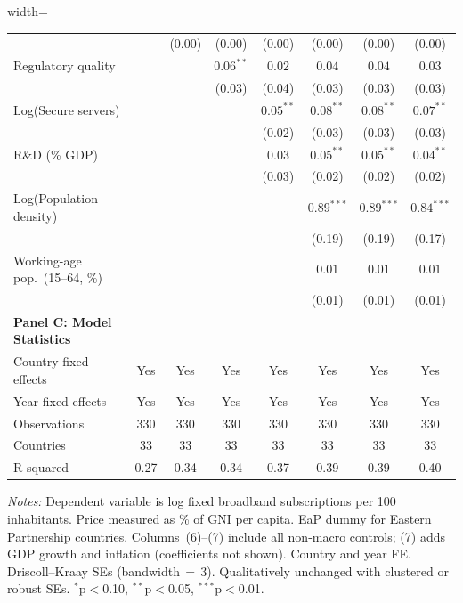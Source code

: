 \begin{table}[H]
\begin{minipage}{\textwidth}
\begin{adjustbox}{width=\textwidth}
\begin{tabular}{@{}lccccccc@{}}
&  & (0.00) & (0.00) & (0.00) & (0.00) & (0.00) & (0.00) \\[2pt]
Regulatory quality &  &  & $0.06^{**}$ & $0.02$ & $0.04$ & $0.04$ & $0.03$ \\
&  &  & (0.03) & (0.04) & (0.03) & (0.03) & (0.03) \\[2pt]
Log(Secure servers) &  &  &  & $0.05^{**}$ & $0.08^{**}$ & $0.08^{**}$ & $0.07^{**}$ \\
&  &  &  & (0.02) & (0.03) & (0.03) & (0.03) \\[2pt]
R\&D (\% GDP) &  &  &  & $0.03$ & $0.05^{**}$ & $0.05^{**}$ & $0.04^{**}$ \\
&  &  &  & (0.03) & (0.02) & (0.02) & (0.02) \\[2pt]
Log(Population density) &  &  &  &  & $0.89^{***}$ & $0.89^{***}$ & $0.84^{***}$ \\
&  &  &  &  & (0.19) & (0.19) & (0.17) \\[2pt]
Working-age pop.\ (15--64, \%) &  &  &  &  & $0.01$ & $0.01$ & $0.01$ \\
&  &  &  &  & (0.01) & (0.01) & (0.01) \\[2pt]
\midrule
\textbf{Panel C: Model Statistics} \\
Country fixed effects & Yes & Yes & Yes & Yes & Yes & Yes & Yes \\
Year fixed effects & Yes & Yes & Yes & Yes & Yes & Yes & Yes \\
Observations & 330 & 330 & 330 & 330 & 330 & 330 & 330 \\
Countries & 33 & 33 & 33 & 33 & 33 & 33 & 33 \\
R-squared & 0.27 & 0.34 & 0.34 & 0.37 & 0.39 & 0.39 & 0.40 \\
\bottomrule
\end{tabular}
\end{adjustbox}
\par\vspace{2pt}
\scriptsize
\textit{Notes:} Dependent variable is log fixed broadband subscriptions per 100 inhabitants.
Price measured as \% of GNI per capita. EaP dummy for Eastern Partnership countries.
Columns~(6)--(7) include all non-macro controls; (7) adds GDP growth and inflation (coefficients not shown).
Country and year FE. Driscoll--Kraay SEs (bandwidth$\,=\,$3). Qualitatively unchanged with clustered or robust SEs.
$^{*}$p$<$0.10, $^{**}$p$<$0.05, $^{***}$p$<$0.01.
\end{minipage}
\end{table}

